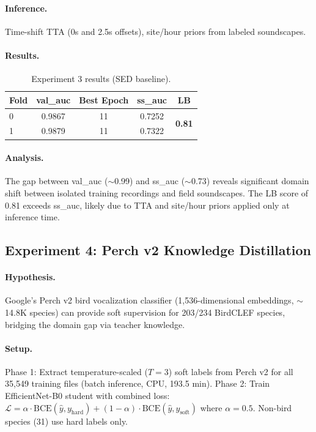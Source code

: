 \paragraph{Inference.}
Time-shift TTA (0s and 2.5s offsets), site/hour priors from labeled soundscapes.

\paragraph{Results.}
\begin{table}[h]
\centering
\caption{Experiment 3 results (SED baseline).}
\label{tab:exp3}
\begin{tabular}{lcccc}
\hline
\textbf{Fold} & \textbf{val\_auc} & \textbf{Best Epoch} & \textbf{ss\_auc} & \textbf{LB} \\
\hline
0 & 0.9867 & 11 & 0.7252 & \multirow{2}{*}{\textbf{0.81}} \\
1 & 0.9879 & 11 & 0.7322 & \\
\hline
\end{tabular}
\end{table}

\paragraph{Analysis.}
The gap between val\_auc ($\sim$0.99) and ss\_auc ($\sim$0.73) reveals significant
domain shift between isolated training recordings and field soundscapes.
The LB score of 0.81 exceeds ss\_auc, likely due to TTA and site/hour priors
applied only at inference time.

\subsection{Experiment 4: Perch v2 Knowledge Distillation}
\label{sec:exp4}

\paragraph{Hypothesis.}
Google's Perch v2 bird vocalization classifier (1,536-dimensional embeddings,
$\sim$14.8K species) can provide soft supervision for 203/234 BirdCLEF species,
bridging the domain gap via teacher knowledge.

\paragraph{Setup.}
Phase 1: Extract temperature-scaled ($T=3$) soft labels from Perch v2 for all
35,549 training files (batch inference, CPU, 193.5 min).
Phase 2: Train EfficientNet-B0 student with combined loss:
$\mathcal{L} = \alpha \cdot \text{BCE}(\hat{y}, y_\text{hard}) + (1-\alpha) \cdot \text{BCE}(\hat{y}, y_\text{soft})$
where $\alpha = 0.5$. Non-bird species (31) use hard labels only.

